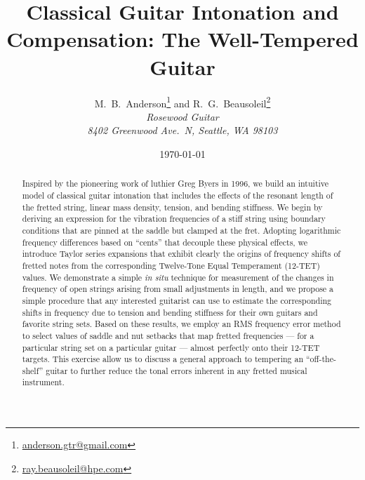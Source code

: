 \documentclass[12pt]{article}
\title{{\Huge\textbf{Classical Guitar Intonation and Compensation: The Well-Tempered Guitar}}}
\author{ M.\ B.\ Anderson\footnote{\href{mailto:Matt Anderson anderson.gtr@gmail.com}{anderson.gtr@gmail.com}} and R.\ G.\ Beausoleil\footnote{\href{mailto:ray.beausoleil@hpe.com}{ray.beausoleil@hpe.com}} \\
 \textit{Rosewood Guitar} \\
 \textit{8402 Greenwood Ave.\ N, Seattle, WA  98103}}
\date{\today}
\begin{document}
 \maketitle

 \begin{abstract}
Inspired by the pioneering work of luthier Greg Byers in 1996, we build an intuitive model of classical guitar intonation that includes the effects of the resonant length of the fretted string, linear mass density, tension, and bending stiffness. We begin by deriving an expression for the vibration frequencies of a stiff string using boundary conditions that are pinned at the saddle but clamped at the fret. Adopting logarithmic frequency differences based on ``cents'' that decouple these physical effects, we introduce Taylor series expansions that exhibit clearly the origins of frequency shifts of fretted notes from the corresponding Twelve-Tone Equal Temperament (12-TET) values. We demonstrate a simple \emph{in situ} technique for measurement of the changes in frequency of open strings arising from small adjustments in length, and we propose a simple procedure that any interested guitarist can use to estimate the corresponding shifts in frequency due to tension and bending stiffness for their own guitars and favorite string sets. Based on these results, we employ an RMS frequency error method to select values of saddle and nut setbacks that map fretted frequencies --- for a particular string set on a particular guitar --- almost perfectly onto their 12-TET targets. This exercise allow us to discuss a general approach to tempering an ``off-the-shelf'' guitar to further reduce the tonal errors inherent in any fretted musical instrument.
 \end{abstract}

 \tableofcontents

 
 
 
 
 
 

 \appendix
 
 
 
 


 
 

 
\end{document}
